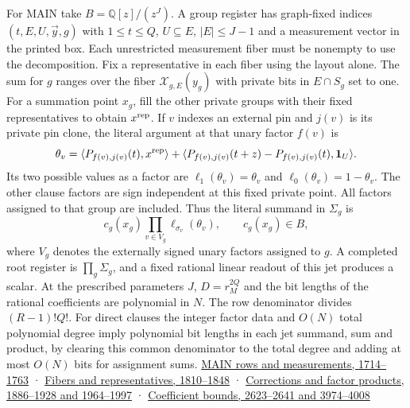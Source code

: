 \documentclass[11pt,a4paper]{article}
\begin{document}
For MAIN take \(B=\mathbb Q[z]/(z^J)\). A group register has graph-fixed
indices \((t,E,U,\vec y,g)\) with \(1\le t\le Q\), \(U\subseteq E\),
\(|E|\le J-1\) and a measurement vector in the printed box. Each
unrestricted measurement fiber must be nonempty to use the
decomposition. Fix a representative in each fiber using the layout
alone. The sum for \(g\) ranges over the fiber \(\mathcal X_{g,E}(y_g)\)
with private bits in \(E\cap S_g\) set to one. For a summation point
\(x_g\), fill the other private groups with their fixed representatives
to obtain \(x^{\rm rep}\). If \(v\) indexes an external pin and \(j(v)\)
is its private pin clone, the literal argument at that unary factor
\(f(v)\) is \[
 \theta_v=\langle P_{f(v),j(v)}(t),x^{\rm rep}\rangle+
 \langle P_{f(v),j(v)}(t+z)-P_{f(v),j(v)}(t),\mathbf1_U\rangle .
\] Its two possible values as a factor are \(\ell_1(\theta_v)=\theta_v\)
and \(\ell_0(\theta_v)=1-\theta_v\). The other clause factors are sign
independent at this fixed private point. All factors assigned to that
group are included. Thus the literal summand in \(\Sigma_g\) is \[
 c_g(x_g)\prod_{v\in V_g}\ell_{\sigma_v}(\theta_v),\qquad c_g(x_g)\in B,
\tag{N1}
\] where \(V_g\) denotes the externally signed unary factors assigned to
\(g\). A completed root register is \(\prod_g\Sigma_g\), and a fixed
rational linear readout of this jet produces a scalar. At the prescribed
parameters \(J\), \(D=r_M^{2Q}\) and the bit lengths of the rational
coefficients are polynomial in \(N\). The row denominator divides
\((R-1)!Q!\). For direct clauses the integer factor data and \(O(N)\)
total polynomial degree imply polynomial bit lengths in each jet
summand, sum and product, by clearing this common denominator to the
total degree and adding at most \(O(N)\) bits for assignment sums.
\href{https://github.com/openai/math/blob/main/preprints/The-Exponential-Time-Hypothesis-is-False-October-25-2026/build/main_full_version.tex\#L1714}{MAIN
rows and measurements, 1714--1763} ·
\href{https://github.com/openai/math/blob/main/preprints/The-Exponential-Time-Hypothesis-is-False-October-25-2026/build/main_full_version.tex\#L1810}{Fibers
and representatives, 1810--1848} ·
\href{https://github.com/openai/math/blob/main/preprints/The-Exponential-Time-Hypothesis-is-False-October-25-2026/build/main_full_version.tex\#L1886}{Corrections
and factor products, 1886--1928 and 1964--1997} ·
\href{https://github.com/openai/math/blob/main/preprints/The-Exponential-Time-Hypothesis-is-False-October-25-2026/build/main_full_version.tex\#L2623}{Coefficient
bounds, 2623--2641 and 3974--4008}
\end{document}
